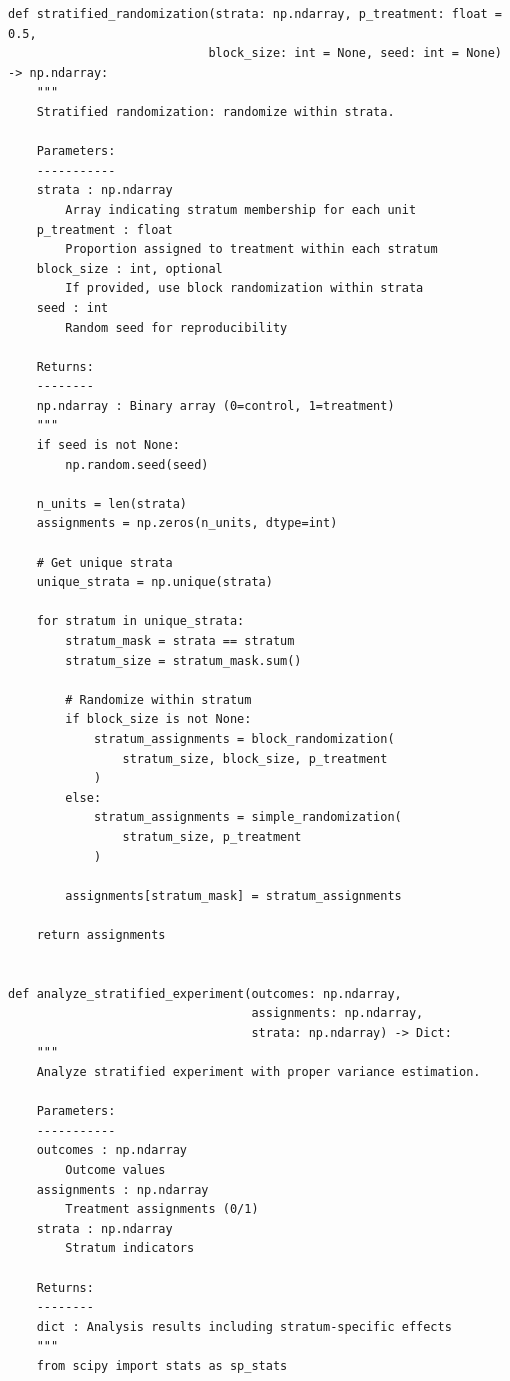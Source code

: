 \lstset{language=Python, caption=Stratified Randomization Implementation, label=lst:stratified_random}
\begin{lstlisting}
def stratified_randomization(strata: np.ndarray, p_treatment: float = 0.5,
                            block_size: int = None, seed: int = None) -> np.ndarray:
    """
    Stratified randomization: randomize within strata.

    Parameters:
    -----------
    strata : np.ndarray
        Array indicating stratum membership for each unit
    p_treatment : float
        Proportion assigned to treatment within each stratum
    block_size : int, optional
        If provided, use block randomization within strata
    seed : int
        Random seed for reproducibility

    Returns:
    --------
    np.ndarray : Binary array (0=control, 1=treatment)
    """
    if seed is not None:
        np.random.seed(seed)

    n_units = len(strata)
    assignments = np.zeros(n_units, dtype=int)

    # Get unique strata
    unique_strata = np.unique(strata)

    for stratum in unique_strata:
        stratum_mask = strata == stratum
        stratum_size = stratum_mask.sum()

        # Randomize within stratum
        if block_size is not None:
            stratum_assignments = block_randomization(
                stratum_size, block_size, p_treatment
            )
        else:
            stratum_assignments = simple_randomization(
                stratum_size, p_treatment
            )

        assignments[stratum_mask] = stratum_assignments

    return assignments


def analyze_stratified_experiment(outcomes: np.ndarray,
                                  assignments: np.ndarray,
                                  strata: np.ndarray) -> Dict:
    """
    Analyze stratified experiment with proper variance estimation.

    Parameters:
    -----------
    outcomes : np.ndarray
        Outcome values
    assignments : np.ndarray
        Treatment assignments (0/1)
    strata : np.ndarray
        Stratum indicators

    Returns:
    --------
    dict : Analysis results including stratum-specific effects
    """
    from scipy import stats as sp_stats


\end{lstlisting}
